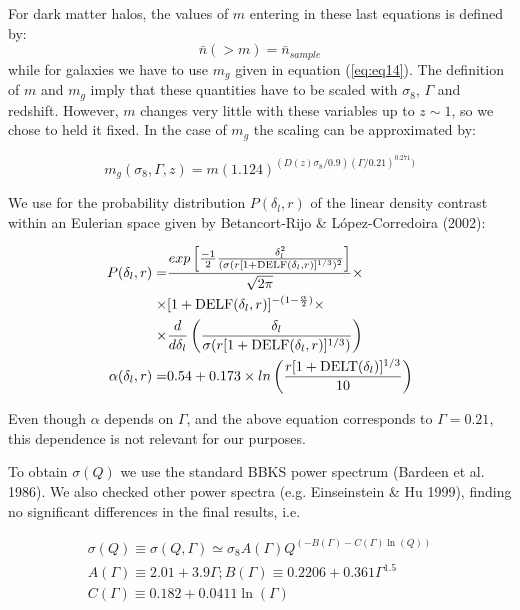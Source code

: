 For dark matter halos, the values of $m$ entering in these last equations is defined by:
\begin{equation}
\bar{n}(>m)=\bar{n}_{sample}
\end{equation}
while for galaxies we have to use $m_g$ given in equation (\ref{eq:eq14}). The definition of $m$ and $m_g$ imply that these 
quantities have to be scaled with $\sigma_{8}$, $\Gamma$ and redshift. However, $m$ changes very little with these variables up to $z\sim 1$, so we 
chose to held it fixed. In the case of $m_g$ the scaling can be approximated by:

\begin{equation}
m_{g}(\sigma_{8},\Gamma,z) = m (1.124)^{(D(z)\sigma_{8}/0.9)(\Gamma/0.21)^{0.271})}
\end{equation}
 

We use for the probability distribution $P(\delta_l,r)$ of the linear density contrast within an Eulerian space given by Betancort-Rijo \& L\'opez-Corredoira (2002):

\begin{eqnarray}
P(\delta_l,r) = &\frac{exp\left[\frac{-1}{2} \frac{\delta_l^2}{(\sigma(r[1+{\rm DELF}(\delta_l,r)]^{1/3})^2}\right]}{\sqrt{2\pi}} \times \nonumber\\ 
\times &[1 + {\rm DELF}(\delta_l,r)]^{-(1-\frac{\alpha}{2})} \times \nonumber\\
\times &\frac{d}{d\delta_l} \left( \frac{\delta_l}{\sigma(r[1+{\rm DELF}(\delta_l,r)]^{1/3})}\right)\nonumber\\
\alpha(\delta_l,r) = &0.54 + 0.173  \times  ln \left( \frac{r[1+{\rm DELT}(\delta_l)]^{1/3}}{10} \right)    \label{eq:eqA7}
\end{eqnarray}

Even though $\alpha$ depends on $\Gamma$, and the above equation corresponds to $\Gamma=0.21$, this dependence is not relevant for our purposes.

To obtain $\sigma(Q)$ we use the standard BBKS power spectrum (Bardeen et al. 1986). We also checked other power spectra (e.g. Einseinstein \& Hu 1999), finding no significant differences in the final results, i.e.

\begin{eqnarray}
\sigma(Q) \equiv \sigma(Q,\Gamma) \simeq \sigma_8 A(\Gamma) Q^{(-B(\Gamma)-C(\Gamma)\ln{(Q)})} \nonumber\\
A(\Gamma) \equiv 2.01 + 3.9 \Gamma ; B(\Gamma) \equiv 0.2206 + 0.361 \Gamma^{1.5} \nonumber \\
C(\Gamma) \equiv 0.182 + 0.0411 \ln{(\Gamma)}     \label{eq:eqA8}
\end{eqnarray}

